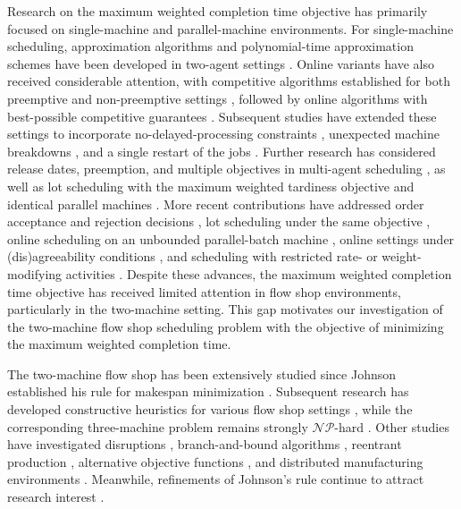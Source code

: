 ﻿\documentclass[12pt]{article} \textheight=24.5cm \textwidth=16.5cm \parskip = 0.165cm
\begin{document}
\begin{sloppypar}
        Research on the maximum weighted completion time objective has primarily focused on single-machine and parallel-machine environments.
        For single-machine scheduling, approximation algorithms and polynomial-time approximation schemes have been developed in two-agent settings \citep{NongChengNg2011EJOR}.
        Online variants have also received considerable attention, with competitive algorithms established for both preemptive and non-preemptive settings \citep{Li-Wenjie2015APJOR}, followed by online algorithms with best-possible competitive guarantees \citep{ChaiLuLi2018APJOR}.
        Subsequent studies have extended these settings to incorporate no-delayed-processing constraints \citep{LiLiu2023OptimLett}, unexpected machine breakdowns \citep{GuoChenMao2024APJOR}, and a single restart of the jobs \citep{LiangLuSun2024AIMSMath}.
        Further research has considered release dates, preemption, and multiple objectives in multi-agent scheduling \citep{YuanNgCheng2020EJOR}, as well as lot scheduling with the maximum weighted tardiness objective \citep{MosheiovSarig2023JOCO} and identical parallel machines \citep{Sun2024JOCO}.
        More recent contributions have addressed order acceptance and rejection decisions \citep{LuZuoZhangOu20254OR}, lot scheduling under the same objective \citep{ZhengLiLiu2025JOCO}, online scheduling on an unbounded parallel-batch machine \citep{ZhangLuYuan2025JOCO}, online settings under (dis)agreeability conditions \citep{FanLuShi2026JIMO}, and scheduling with restricted rate- or weight-modifying activities \citep{ZuoZhangShiFan2026DAM,ZuoLuZhang2026IJFCS}.
        Despite these advances, the maximum weighted completion time objective has received limited attention in flow shop environments, particularly in the two-machine setting.
        This gap motivates our investigation of the two-machine flow shop scheduling problem with the objective of minimizing the maximum weighted completion time.

        The two-machine flow shop has been extensively studied since Johnson established his rule for makespan minimization \citep{Johnson1954NRL}.
        Subsequent research has developed constructive heuristics for various flow shop settings \citep{ShaoShaoPi2021COR}, while the corresponding three-machine problem remains strongly $\mathcal{NP}$-hard \citep{Pinedo2022scheduling}.
        Other studies have investigated disruptions \citep{HnaienArbaoui2023ANOR}, branch-and-bound algorithms \citep{LiuUrgo2024IJPR}, reentrant production \citep{LiuUrgo2024ANOR}, alternative objective functions \mbox{\citep{ShabtayGerstl2024EJOR}}, and distributed manufacturing environments \citep{BeckerNeufeldBuscher2025EJOR}.
        Meanwhile, refinements of Johnson's rule continue to attract research interest \citep{DellaCroceSchau2026ORL}.


\end{sloppypar}
\end{document}
